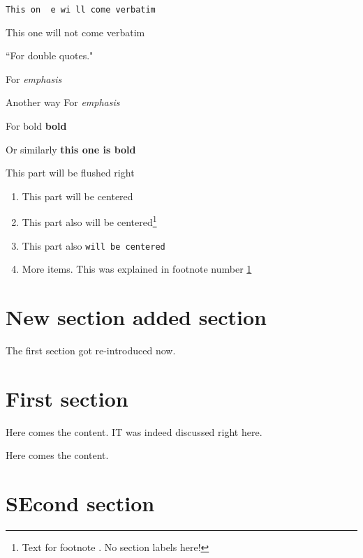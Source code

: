 \documentclass[12pt,a4paper]{beamer}
\begin{document}
\vspace{5cm}

\verb*&This on  e wi ll come verbatim&

\noindent
This one will not come verbatim



``For double quotes."

For {\em emphasis}

Another way
For \emph{emphasis}

For bold \textbf{bold}

Or similarly {\bf this one is bold}

\begin{flushright}
This part will be flushed right
\end{flushright}



\begin{enumerate}
\item This part will be centered

\item This part also will be centered\footnote{Text for footnote
\label{footnote-my-name}. No section labels here! }

\item This part also \texttt{will be centered}
\item More items. This was explained in footnote number 
\ref{footnote-my-name} 
\end{enumerate}













\section{New section added section}

The first section got re-introduced now.

\section{First section} \label{our:name:section1}

Here comes the content.
IT was indeed discussed right here.

Here comes the content.

\section*{SEcond section}
\end{document}
